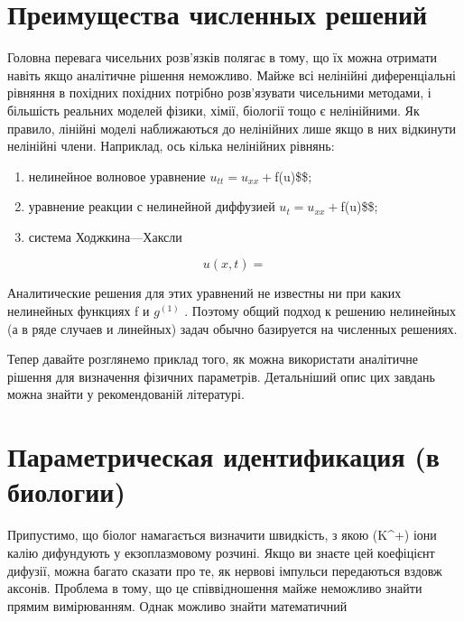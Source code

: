 \documentclass[
  ukrainian,
]{article}
\begin{document}
\section{Преимущества численных
решений}\label{ux43fux440ux435ux438ux43cux443ux449ux435ux441ux442ux432ux430-ux447ux438ux441ux43bux435ux43dux43dux44bux445-ux440ux435ux448ux435ux43dux438ux439}

Головна перевага чисельних розв'язків полягає в тому, що їх можна
отримати навіть якщо аналітичне рішення неможливо. Майже всі нелінійні
диференціальні рівняння в похідних похідних потрібно розв'язувати
чисельними методами, і більшість реальних моделей фізики, хімії,
біології тощо є нелінійними. Як правило, лінійні моделі наближаються до
нелінійних лише якщо в них відкинути нелінійні члени. Наприклад, ось
кілька нелінійних рівнянь:

\begin{enumerate}
\def\labelenumi{\arabic{enumi})}
\item
  нелинейное волновое уравнение \(u_{tt} = u_{xx} +\)f(u)\$\$;
\item
  уравнение реакции с нелинейной диффузией \(u_t = u_{xx} +\)f(u)\$\$;
\item
  система Ходжкина---Хаксли
\end{enumerate}

\[
u(x, t) =
\]

Аналитические решения для этих уравнений не известны ни при каких
нелинейных функциях f и \(g^{(1)}\) . Поэтому общий подход к решению
нелинейных (а в ряде случаев и линейных) задач обычно базируется на
численных решениях.

Тепер давайте розглянемо приклад того, як можна використати аналітичне
рішення для визначення фізичних параметрів. Детальніший опис цих завдань
можна знайти у рекомендованій літературі.

\section{Параметрическая идентификация (в
биологии)}\label{ux43fux430ux440ux430ux43cux435ux442ux440ux438ux447ux435ux441ux43aux430ux44f-ux438ux434ux435ux43dux442ux438ux444ux438ux43aux430ux446ux438ux44f-ux432-ux431ux438ux43eux43bux43eux433ux438ux438}

Припустимо, що біолог намагається визначити швидкість, з якою (K\^{}+)
іони калію дифундують у екзоплазмовому розчині. Якщо ви знаєте цей
коефіцієнт дифузії, можна багато сказати про те, як нервові імпульси
передаються вздовж аксонів. Проблема в тому, що це співвідношення майже
неможливо знайти прямим вимірюванням. Однак можливо знайти математичний
\end{document}
